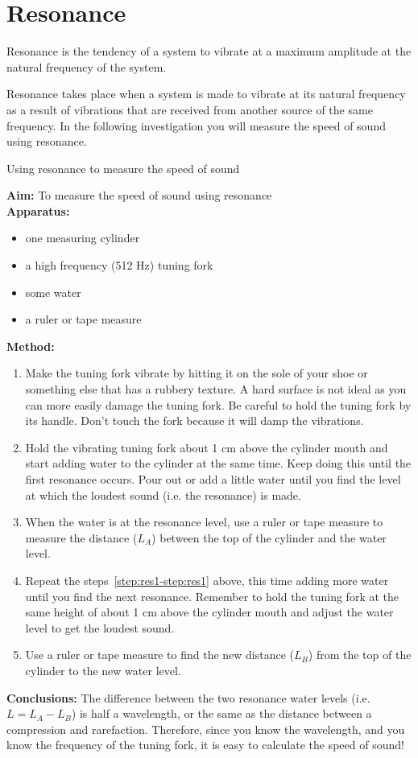 \section{Resonance}
Resonance is the tendency of a system to vibrate at a maximum amplitude at the natural frequency
of the system.

Resonance takes place when a system is made to vibrate at its natural frequency as a result of vibrations
that are received from another source of the same frequency. In the following investigation you will
measure the speed of sound using resonance.

\begin{g_experiment}{Using resonance to measure the speed of sound}
{
\textbf{Aim: } To measure the speed of sound using resonance\\
\textbf{Apparatus: } 
\begin{itemize}
\item one measuring cylinder
\item a high frequency (512 Hz) tuning fork
\item some water
\item a ruler or tape measure
\end{itemize}

\textbf{Method: }
\begin{enumerate}
\item Make the tuning fork vibrate by hitting it on the sole of your shoe or something else that has a rubbery texture.
A hard surface is not ideal as you can more easily damage the tuning fork. Be careful to hold the tuning fork by its handle. Don't touch the fork because it will damp the vibrations. \label{step:res1}

\item Hold the vibrating tuning fork about 1 cm above the cylinder mouth and start adding water to the cylinder
at the same time. Keep doing this until the first resonance occurs. Pour out or add a little water until you find the level
at which the loudest sound (i.e.\@{} the resonance) is made.\label{step:res2}

\item When the water is at the resonance level, use a ruler or tape measure to measure the distance ($L_{A}$) between the top of the cylinder
and the water level.\label{step:res3}

\item Repeat the steps~\ref{step:res1-step:res1} above, this time adding more water until you find the next resonance.
Remember to hold the tuning fork at the same height of about 1 cm above the cylinder mouth and adjust the water level
to get the loudest sound.

\item Use a ruler or tape measure to find the new distance ($L_{B}$) from the top of the cylinder to the new water level.
\end{enumerate}
\textbf{Conclusions: } The difference between the two resonance water levels (i.e.\@{} $L = L_{A}-L_{B}$) is half a wavelength, or the same as
the distance between a compression and rarefaction. Therefore, since you know the wavelength, and you know the frequency
of the tuning fork, it is easy to calculate the speed of sound!
}
\end{g_experiment} 
